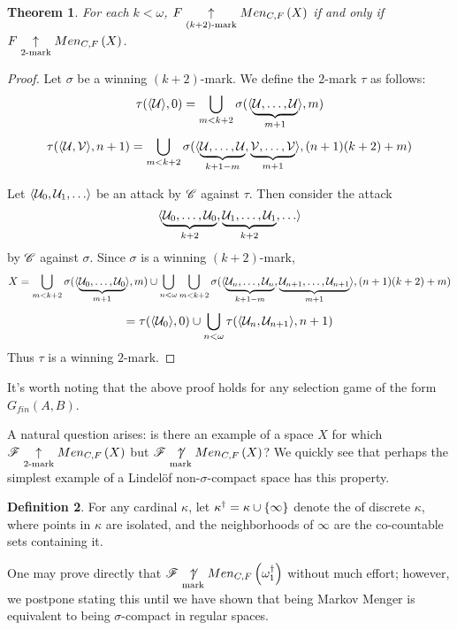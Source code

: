\documentclass{amsart}
\newtheorem{theorem}{Theorem}[section]
\theoremstyle{definition}
\newtheorem{definition}[theorem]{Definition}
\begin{document}
\begin{theorem}
  For each \(k<\omega\), \(F \underset{(k+2)\text{-mark}}{\uparrow} Men_{C,F}\left({X}\right)\)
  if and only if \(F \underset{2\text{-mark}}{\uparrow} Men_{C,F}\left({X}\right)\).
\end{theorem}

\begin{proof}
  Let \(\sigma\) be a winning \((k+2)\)-mark. We define the \(2\)-mark \(\tau\) as
  follows:
    \[
      \tau(\langle\mathcal{U}\rangle,0)
        =
      \bigcup_{m<k+2}
        \sigma(\langle\underbrace{\mathcal{U},\dots,\mathcal{U}}_{m+1}\rangle,m)
    \]
    \[
      \tau(\langle\mathcal{U},\mathcal{V}\rangle,n+1)
        =
      \bigcup_{m<k+2}
        \sigma(\langle
          \underbrace{\mathcal{U},\dots,\mathcal{U}}_{k+1-m},
          \underbrace{\mathcal{V},\dots,\mathcal{V}}_{m+1}
        \rangle,(n+1)(k+2)+m)
    \]

  Let \(\<\mc U_0,\mc U_1,\dots\>\) be an attack by \(\mathscr{C}\) against \(\tau\).
  Then consider the attack
    \[
      \<
        \underbrace{\mc U_0,\dots,\mc U_0}_{k+2},
        \underbrace{\mc U_1,\dots,\mc U_1}_{k+2},
        \dots
      \>
    \]
  by \(\mathscr{C}\) against \(\sigma\). Since \(\sigma\) is a winning \((k+2)\)-mark,
    \[
      X
        =
      \bigcup_{m<k+2}
        \sigma(\langle\underbrace{\mathcal{U}_0,\dots,\mathcal{U}_0}_{m+1}\rangle,m)
      \cup
      \bigcup_{n<\omega}
      \bigcup_{m<k+2}
        \sigma(\langle
          \underbrace{\mathcal{U}_n,\dots,\mathcal{U}_n}_{k+1-m},
          \underbrace{\mathcal{U}_{n+1},\dots,\mathcal{U}_{n+1}}_{m+1}
        \rangle,(n+1)(k+2)+m)
    \]
    \[
      =
      \tau(\langle\mathcal{U}_0\rangle,0)
      \cup
      \bigcup_{n<\omega}
      \tau(\langle\mathcal{U}_n,\mathcal{U}_{n+1}\rangle,n+1)
    \]
  Thus \(\tau\) is a winning \(2\)-mark.
\end{proof}

It's worth noting that the above proof holds for any selection game of
the form \(G_{fin}(A,B)\).

A natural question arises: is there an example of a space \(X\) for which
\(\mathscr{F}\underset{2\text{-mark}}{\uparrow}Men_{C,F}\left({X}\right)\) but \(\mathscr{F}\underset{\text{mark}}{\not\uparrow}Men_{C,F}\left({X}\right)\)? We quickly
see that perhaps the simplest example of a Lindel\"of non-\(\sigma\)-compact
space has this property.

\begin{definition}
  For any cardinal \(\kappa\), let \(\kappa^\dagger=\kappa\cup\{\infty\}\) denote
  the  of discrete \(\kappa\), where points in
  \(\kappa\) are isolated, and the neighborhoods of \(\infty\) are the co-countable
  sets containing it.
\end{definition}

One may prove directly that
  \(\mathscr{F} \underset{\text{mark}}{\not\uparrow} Men_{C,F}\left({\omega_1^\dagger}\right)\)
without much effort; however, we postpone stating this until we have
shown that being Markov Menger is equivalent to being \(\sigma\)-compact
in regular spaces.
\end{document}
